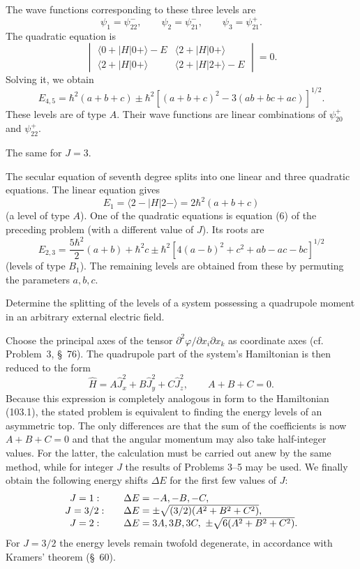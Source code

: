 The wave functions corresponding to these three levels are
\[
 \psi_1=\psi_{22}^-,\qquad \psi_2=\psi_{21}^-,\qquad \psi_3=\psi_{21}^+.
\]
The quadratic equation is
\begin{equation}
 \begin{vmatrix}
 \langle0+|H|0+\rangle-E&\langle2+|H|0+\rangle\\
 \langle2+|H|0+\rangle&\langle2+|H|2+\rangle-E
 \end{vmatrix}=0. \tag{6}
\end{equation}
Solving it, we obtain
\begin{equation}
 E_{4,5}=\hbar^2(a+b+c)\pm\hbar^2[(a+b+c)^2-3(ab+bc+ac)]^{1/2}. \tag{7}
\end{equation}
These levels are of type $A$. Their wave functions are linear combinations of $\psi_{20}^+$ and $\psi_{22}^+$.

 The same for $J=3$.

\SolutionHeading The secular equation of seventh degree splits into one linear and three quadratic equations. The linear equation gives
\begin{equation}
 E_1=\langle2-|H|2-\rangle=2\hbar^2(a+b+c) \tag{8}
\end{equation}
(a level of type $A$). One of the quadratic equations is equation (6) of the preceding problem (with a different value of $J$). Its roots are
\begin{equation}
 E_{2,3}=\frac{5\hbar^2}{2}(a+b)+\hbar^2c\pm\hbar^2[4(a-b)^2+c^2+ab-ac-bc]^{1/2} \tag{9}
\end{equation}
(levels of type $B_1$). The remaining levels are obtained from these by permuting the parameters $a,b,c$.

 Determine the splitting of the levels of a system possessing a quadrupole moment in an arbitrary external electric field.

\SolutionHeading Choose the principal axes of the tensor $\partial^2\varphi/\partial x_i\partial x_k$ as coordinate axes (cf. Problem~3, \S~76). The quadrupole part of the system's Hamiltonian is then reduced to the form
\[
 \hat H=A\hat J_x^2+B\hat J_y^2+C\hat J_z^2,\qquad A+B+C=0.
\]
Because this expression is completely analogous in form to the Hamiltonian (103.1), the stated problem is equivalent to finding the energy levels of an asymmetric top. The only differences are that the sum of the coefficients is now $A+B+C=0$ and that the angular momentum may also take half-integer values. For the latter, the calculation must be carried out anew by the same method, while for integer $J$ the results of Problems 3--5 may be used. We finally obtain the following energy shifts $\Delta E$ for the first few values of $J$:
\[
\begin{array}{c@{\qquad}l}
J=1:&\Delta E=-A,-B,-C,\\
J=3/2:&\Delta E=\pm\sqrt{(3/2)(A^2+B^2+C^2)},\\
J=2:&\Delta E=3A,3B,3C,\ \pm\sqrt{6(A^2+B^2+C^2)}.
\end{array}
\]
For $J=3/2$ the energy levels remain twofold degenerate, in accordance with Kramers' theorem (\S~60).
